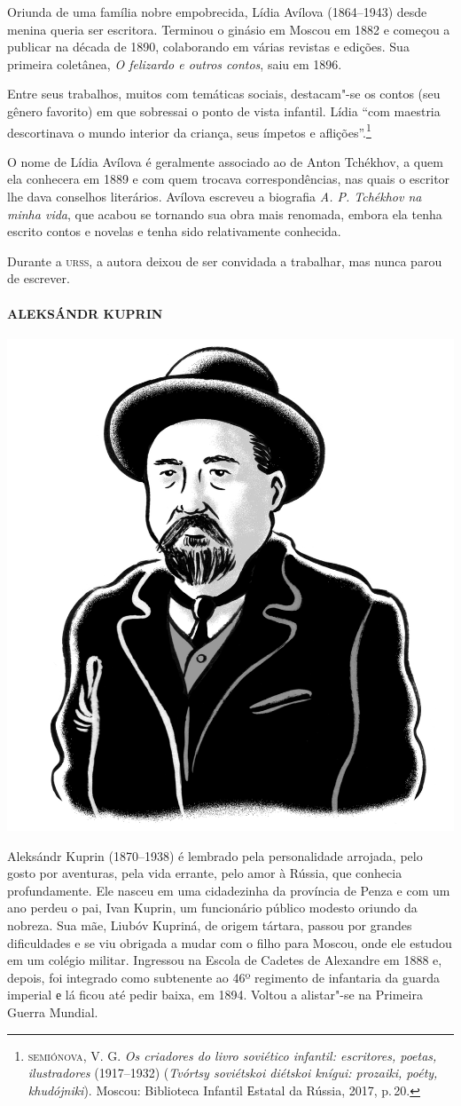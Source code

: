 \noindent{}Oriunda de uma família nobre empobrecida, Lídia Avílova (1864--1943)
desde menina queria ser escritora. Terminou o ginásio em Moscou em 1882
e começou a publicar na década de 1890, colaborando em várias revistas e
edições. Sua primeira coletânea, \emph{O felizardo e outros contos},
saiu em 1896.

Entre seus trabalhos, muitos com temáticas sociais, destacam"-se os
contos (seu gênero favorito) em que sobressai o ponto de vista infantil.
Lídia ``com maestria descortinava o mundo interior da criança, seus
ímpetos e aflições''.\footnote{\scriptsize\textsc{semiónova}, V. G. \emph{Os criadores do
  livro soviético infantil: escritores, poetas, ilustradores}
  (1917--1932) (\emph{Tvórtsy soviétskoi diétskoi knígui: prozaiki,
  poéty, khudójniki}). Moscou: Biblioteca Infantil Еstatal da Rússia,
  2017, p.\,20.}

O nome de Lídia Avílova é geralmente associado ao de Anton Tchékhov, a
quem ela conhecera em 1889 e com quem trocava correspondências, nas
quais o escritor lhe dava conselhos literários. Avílova escreveu a
biografia \emph{A. P. Tchékhov na minha vida}, que acabou se tornando
sua obra mais renomada, embora ela tenha escrito contos e novelas e
tenha sido relativamente conhecida.

Durante a \textsc{urss}, a autora deixou de ser convidada a trabalhar, mas nunca
parou de escrever.

\paragraph{ALEKSÁNDR KUPRIN}

\noindent\includegraphics[width=.8in]{./imgs/autor9.jpg}

\noindent{}Aleksándr Kuprin (1870--1938) é lembrado pela personalidade arrojada,
pelo gosto por aventuras, pela vida errante, pelo amor à Rússia, que
conhecia profundamente. Ele nasceu em uma cidadezinha da província de
Penza e com um ano perdeu o pai, Ivan Kuprin, um
funcionário público modesto oriundo da nobreza. Sua mãe, Liubóv Kupriná, de origem tártara, passou por grandes dificuldades e se
viu obrigada a mudar com o filho para Moscou, onde ele estudou em um
colégio militar. Ingressou na Escola de Cadetes de Alexandre em 1888 e,
depois, foi integrado como subtenente ao 46º regimento de infantaria da
guarda imperial е lá ficou até pedir baixa, em 1894. Voltou a alistar"-se
na Primeira Guerra Mundial.

